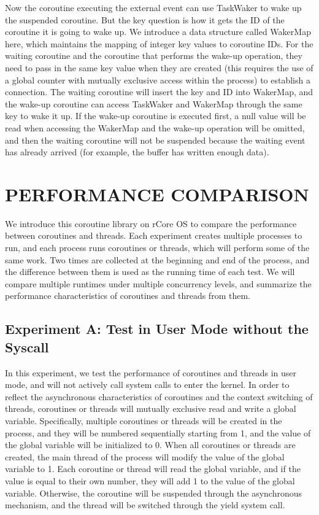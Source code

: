 \documentclass[10pt]{article}
\begin{document}
Now the coroutine executing the external event can use TaskWaker to wake up the suspended coroutine. But the key question is how it gets the ID of the coroutine it is going to wake up. We introduce a data structure called WakerMap here, which maintains the mapping of integer key values to coroutine IDs. For the waiting coroutine and the coroutine that performs the wake-up operation, they need to pass in the same key value when they are created (this requires the use of a global counter with mutually exclusive access within the process) to establish a connection. The waiting coroutine will insert the key and ID into WakerMap, and the wake-up coroutine can access TaskWaker and WakerMap through the same key to wake it up. If the wake-up coroutine is executed first, a null value will be read when accessing the WakerMap and the wake-up operation will be omitted, and then the waiting coroutine will not be suspended because the waiting event has already arrived (for example, the buffer has written enough data).


\section{PERFORMANCE COMPARISON}

We introduce this coroutine library on rCore OS to compare the performance between coroutines and threads. Each experiment creates multiple processes to run, and each process runs coroutines or threads, which will perform some of the same work. Two times are collected at the beginning and end of the process, and the difference between them is used as the running time of each test. We will compare multiple runtimes under multiple concurrency levels, and summarize the performance characteristics of coroutines and threads from them.

\subsection{Experiment A: Test in User Mode without the Syscall}

In this experiment, we test the performance of coroutines and threads in user mode, and will not actively call system calls to enter the kernel. In order to reflect the asynchronous characteristics of coroutines and the context switching of threads, coroutines or threads will mutually exclusive read and write a global variable. Specifically, multiple coroutines or threads will be created in the process, and they will be numbered sequentially starting from 1, and the value of the global variable will be initialized to 0. When all coroutines or threads are created, the main thread of the process will modify the value of the global variable to 1. Each coroutine or thread will read the global variable, and if the value is equal to their own number, they will add 1 to the value of the global variable. Otherwise, the coroutine will be suspended through the asynchronous mechanism, and the thread will be switched through the yield system call.
\end{document}
